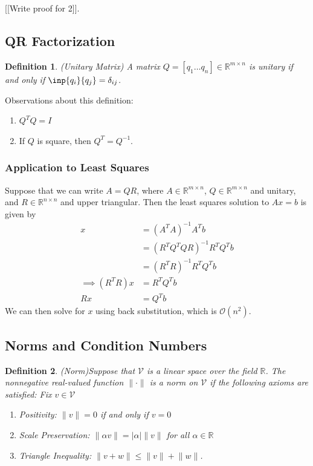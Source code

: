 \documentclass[12pt]{article}
\newtheorem{definition}{Definition}
\theoremstyle{definition}
\newcommand{\R}{\mathbb{R}}
\newcommand{\norm}[1]{\lVert#1\rVert}
\begin{document}
[[Write proof for 2]].

\subsection{QR Factorization}
\begin{definition}(Unitary Matrix)
A matrix $Q = [q_1 \ldots q_n] \in \R^{m\times n}$ is unitary if and only if $\inp{q_i}{q_j} = \delta_{ij}$.
\end{definition}

Observations about this definition:
\begin{enumerate}
	\item $Q^T Q = I$
	\item If $Q$ is square, then $Q^T = Q^{-1}$.
\end{enumerate}

\subsubsection{Application to Least Squares}
Suppose that we can write $A = QR$, where $A \in \R^{ m \times n}$, $Q \in \R^{ m \times n}$ and unitary, and $R \in \R^{n \times n}$ and upper triangular. Then the least squares solution to $Ax = b$ is given by
\begin{align*}
x &= (A^T A)^{-1} A^T b \\
&= (R^T Q^T Q R)^{-1} R^T Q^T b \\
&= (R^T R)^{-1} R^T Q^T b \\
\implies (R^T R) x &= R^T Q^T b \\
R x &= Q^T b \tag{assume $R$ is invertible (i.e. no zeros on the diagonal)}
\end{align*}
We can then solve for $x$ using back substitution, which is $\mathcal{O}(n^2)$.


\subsection{Norms and Condition Numbers}
\begin{definition}(Norm)\label{norm}
Suppose that $\mathcal{V}$ is a linear space over the field $\R$. The \textit{nonnegative} real-valued function $\norm{\cdot}$ is a norm on $\mathcal{V}$ if the following axioms are satisfied: Fix $v \in \mathcal{V}$
\begin{enumerate}
	\item Positivity: $\norm{v} = 0$ if and only if $v = 0$
	\item Scale Preservation: $\norm{\alpha v} = |\alpha| \norm{v}$ for all $\alpha \in \R$
	\item Triangle Inequality: $\norm{v + w} \leq \norm{v} + \norm{w}$.
\end{enumerate}
\end{definition}
\end{document}
